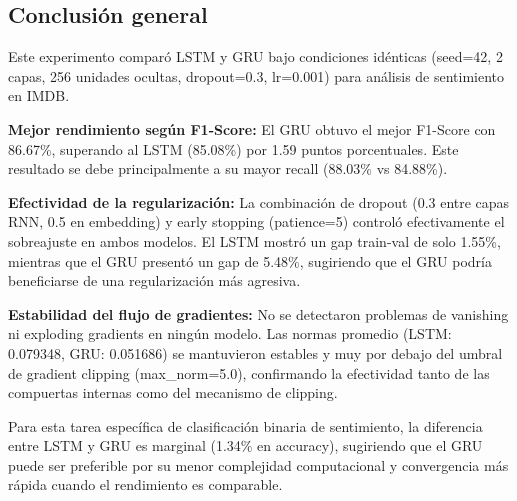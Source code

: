 \subsection{Conclusión general}

Este experimento comparó LSTM y GRU bajo condiciones idénticas (seed=42, 2 capas, 256 unidades ocultas, dropout=0.3, lr=0.001) para análisis de sentimiento en IMDB.

\textbf{Mejor rendimiento según F1-Score:} El GRU obtuvo el mejor F1-Score con 86.67\%, superando al LSTM (85.08\%) por 1.59 puntos porcentuales. Este resultado se debe principalmente a su mayor recall (88.03\% vs 84.88\%).

\textbf{Efectividad de la regularización:} La combinación de dropout (0.3 entre capas RNN, 0.5 en embedding) y early stopping (patience=5) controló efectivamente el sobreajuste en ambos modelos. El LSTM mostró un gap train-val de solo 1.55\%, mientras que el GRU presentó un gap de 5.48\%, sugiriendo que el GRU podría beneficiarse de una regularización más agresiva.

\textbf{Estabilidad del flujo de gradientes:} No se detectaron problemas de vanishing ni exploding gradients en ningún modelo. Las normas promedio (LSTM: 0.079348, GRU: 0.051686) se mantuvieron estables y muy por debajo del umbral de gradient clipping (max\_norm=5.0), confirmando la efectividad tanto de las compuertas internas como del mecanismo de clipping.

Para esta tarea específica de clasificación binaria de sentimiento, la diferencia entre LSTM y GRU es marginal (1.34\% en accuracy), sugiriendo que el GRU puede ser preferible por su menor complejidad computacional y convergencia más rápida cuando el rendimiento es comparable.
